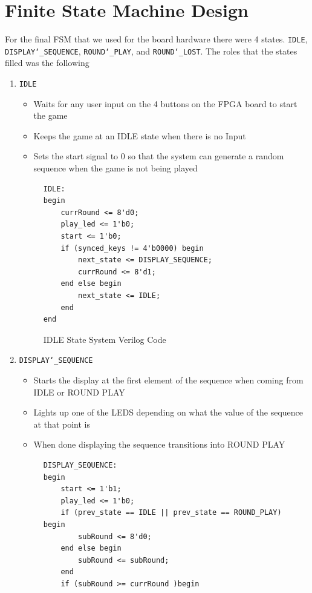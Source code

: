 \documentclass{report}
\begin{document}
\section{Finite State Machine Design}\label{FSM_DESIGN}
For the final FSM that we used for the board hardware there were 4 states. \texttt{IDLE},  \texttt{DISPLAY\char`_SEQUENCE}, \texttt{ROUND\char`_PLAY}, and \texttt{ROUND\char`_LOST}. The roles that the states filled was the following
\begin{enumerate}
    \item \texttt{IDLE}
    \begin{itemize}
        \item Waits for any user input on the 4 buttons on the FPGA board to start the game
        \item Keeps the game at an IDLE state when there is no Input
        \item Sets the start signal to 0 so that the system can generate a random sequence when the game is not being played
    \end{itemize}
    \begin{figure}[H]
        \begin{verbatim}
IDLE:
begin
    currRound <= 8'd0;
    play_led <= 1'b0;
    start <= 1'b0;
    if (synced_keys != 4'b0000) begin
        next_state <= DISPLAY_SEQUENCE;
        currRound <= 8'd1;
    end else begin
        next_state <= IDLE;
    end
end
        \end{verbatim}
        \caption{IDLE State System Verilog Code}
    \end{figure}
    \item \texttt{DISPLAY\char`_SEQUENCE}
    \begin{itemize}
        \item Starts the display at the first element of the sequence when coming from IDLE or ROUND PLAY 
        \item Lights up one of the LEDS depending on what the value of the sequence at that point is
        \item When done displaying the sequence transitions into ROUND PLAY
    \end{itemize}
    \begin{figure}[H]
        \begin{verbatim}
DISPLAY_SEQUENCE:
begin
    start <= 1'b1;
    play_led <= 1'b0;
    if (prev_state == IDLE || prev_state == ROUND_PLAY) begin
        subRound <= 8'd0;
    end else begin
        subRound <= subRound;
    end
    if (subRound >= currRound )begin

\end{verbatim}
\end{figure}
\end{enumerate}
\end{document}
